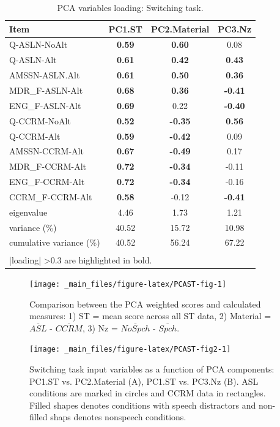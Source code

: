 \documentclass[a4paper, twoside]{templates/ociamthesis}
\begin{document}
\begin{table}

\caption{\label{tab:PCAST-Tab}PCA variables loading: Switching task.}
\centering
\begin{tabular}[t]{lccc}
\toprule
Item & PC1.ST & PC2.Material & PC3.Nz\\
\midrule
Q-ASLN-NoAlt & \textbf{0.59} & \textbf{0.60} & 0.08\\
Q-ASLN-Alt & \textbf{0.61} & \textbf{0.42} & \textbf{0.43}\\
AMSSN-ASLN.Alt & \textbf{0.61} & \textbf{0.50} & \textbf{0.36}\\
MDR\_F-ASLN-Alt & \textbf{0.68} & \textbf{0.36} & \textbf{-0.41}\\
ENG\_F-ASLN-Alt & \textbf{0.69} & 0.22 & \textbf{-0.40}\\
Q-CCRM-NoAlt & \textbf{0.52} & \textbf{-0.35} & \textbf{0.56}\\
Q-CCRM-Alt & \textbf{0.59} & \textbf{-0.42} & 0.09\\
AMSSN-CCRM-Alt & \textbf{0.67} & \textbf{-0.49} & 0.17\\
MDR\_F-CCRM-Alt & \textbf{0.72} & \textbf{-0.34} & -0.11\\
ENG\_F-CCRM-Alt & \textbf{0.72} & \textbf{-0.34} & -0.16\\
CCRM\_F-CCRM-Alt & \textbf{0.58} & -0.12 & \textbf{-0.41}\\
\midrule
eigenvalue & 4.46 & 1.73 & 1.21\\
variance (\%) & 40.52 & 15.72 & 10.98\\
cumulative variance (\%) & 40.52 & 56.24 & 67.22\\
\bottomrule
\multicolumn{4}{l}{\textsuperscript{} |loading| >0.3 are highlighted in bold.}\\
\end{tabular}
\end{table}

\begin{figure}

{\centering \texttt{[image: \_main\_files/figure-latex/PCAST-fig-1]} 

}

\caption{Comparison between the PCA weighted scores and calculated measures: 1) ST = mean score across all ST data, 2) Material = $\overline{ASL}$ - $\overline{CCRM}$, 3) Nz = $\overline{NoSpch}$ - $\overline{Spch}$.}\label{fig:PCAST-fig}
\end{figure}

\begin{figure}

{\centering \texttt{[image: \_main\_files/figure-latex/PCAST-fig2-1]} 

}

\caption{Switching task input variables as a function of PCA components: PC1.ST vs. PC2.Material (A), PC1.ST vs. PC3.Nz (B). ASL conditions are marked in circles and CCRM data in rectangles. Filled shapes denotes conditions with speech distractors and non-filled shaps denotes nonspeech conditions.}\label{fig:PCAST-fig2}
\end{figure}
\end{document}
